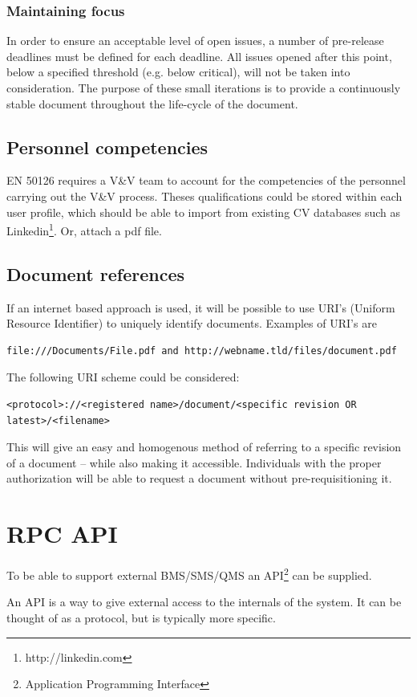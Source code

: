 \documentclass[10pt,a4paper]{article}
\begin{document}
\subsubsection{Maintaining focus}
In order to ensure an acceptable level of open issues, a number of pre-release deadlines must be defined for each deadline. All issues opened after this point, below a specified threshold (e.g. below critical), will not be taken into consideration. The purpose of these small iterations is to provide a continuously stable document throughout the life-cycle of the document.

\subsection{Personnel competencies}
EN 50126 requires a V\&V team to account for the competencies of the personnel carrying out the V\&V process. Theses qualifications could be stored within each user profile, which should be able to import from existing CV databases such as Linkedin\footnote{http://linkedin.com}. Or, attach a pdf file.

\subsection{Document references}
If an internet based approach is used, it will be possible to use URI's (Uniform Resource Identifier) to uniquely identify documents. Examples of URI's are 
\begin{verbatim}
file:///Documents/File.pdf and http://webname.tld/files/document.pdf
\end{verbatim}
The following URI scheme could be considered: 
\begin{verbatim}
<protocol>://<registered name>/document/<specific revision OR latest>/<filename>
\end{verbatim}

This will give an easy and homogenous method of referring to a specific revision of a document – while also making it accessible. Individuals with the proper authorization will be able to request a document without pre-requisitioning it.


\section{RPC API}
To be able to support external BMS/SMS/QMS an API\footnote{Application Programming Interface} can be supplied.

An API is a way to give external access to the internals of the system. It can be thought of as a protocol, but is typically more specific.
\end{document}
